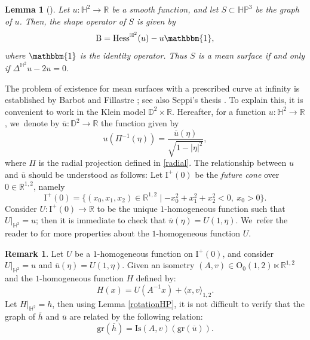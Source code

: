 \documentclass[JEP,XML,SOM,Unicode,NoEqCountersInSection, NoFloatCountersInSection,published]{cedram}
\theoremstyle{plain}
\newtheorem{lemma}[cor]{Lemma}
\theoremstyle{definition}
\newtheorem{remark}[cor]{Remark}
\newcommand{\minko}{\mathbb{R}^{1,2}}
\newcommand{\HP}{\mathbb{HP}^3}
\newcommand{\I}{\mathrm{I}}
\newcommand{\hess}{\mathrm{Hess}^{\mathbb{H}^2}}
\newcommand{\B}{\mathrm{B}}
\newcommand{\inner}[1] {\langle #1 \rangle}
\begin{document}
\begin{lemma}[{\cite[Lem.\,9.1.7]{Seppi_thesis}}]\label{Shapeoperator_of_graph}
Let $u:\mathbb{H}^2\to\mathbb{R}$ be a smooth function, and let $S\subset\HP$ be the graph of $u$. Then, the shape operator of $S$ is given by
\[
\B=\hess(u)-u\mathbbm{1},
\]
where $\mathbbm{1}$ is the identity operator. Thus $S$ is a mean surface if and only if $\Delta^{\mathbb{H}^2} u-2u=0$.
\end{lemma}
The problem of existence for mean surfaces with a prescribed curve at infinity is established by Barbot and Fillastre \cite{barbotfillastre}; see also Seppi's thesis \cite[Chap.\,9]{Seppi_thesis}. To explain this, it is convenient to work in the Klein model $\mathbb{D}^2\times\mathbb{R}$. Hereafter, for a function $u:\mathbb{H}^2\to\mathbb{R}$, we~denote by $\overline{u}:\mathbb{D}^2\to\mathbb{R}$ the function given by
\begin{equation}\label{u_et_u_bar}
u(\Pi^{-1}(\eta))=\frac{\overline{u}(\eta)}{\sqrt{1-\lvert\eta\rvert^2}},
\end{equation} where $\Pi$ is the radial projection defined in \eqref{radial}. The relationship between $u$ and $\overline{u}$ should be understood as follows: Let $\I^+(0)$ be the \emph{future cone} over $0\in\minko$, namely
\[
\I^+(0)=\{(x_0,x_1,x_2)\in\minko\mid -x_0^2+x_1^2+x_2^2<0,\ x_0>0 \}.
\]
Consider $U:\I^{+}(0)\to\mathbb{R}$ to be the unique $1$-homogeneous function such that $U|_{\mathbb{H}^2}=u$; then it is immediate to check that $\overline{u}(\eta)=U(1,\eta)$. We~refer the reader to \cite{françois_vernolli} for more properties about the $1$-homogeneous function $U$.

\begin{remark}
Let $U$ be a $1$-homogeneous function on $\I^{+}(0)$, and consider $U|_{\mathbb{H}^2}=u$ and $\overline{u}(\eta)=U(1,\eta)$. Given an isometry $(A,v)\in\mathrm{O}_0(1,2)\ltimes\minko$ and the $1$-homogeneous function $H$ defined by:
\[
H(x)=U(A^{-1}x)+\inner{x,v}_{1,2}.
\]Let $H|_{\mathbb{H}^2}=h$, then using Lemma \ref{rotationHP}, it is not difficult to verify that the graph of $\overline{h}$ and $\overline{u}$ are related by the following relation:
\begin{equation}\label{h_et_h_bar}
\mathrm{gr}(\overline{h})=\mathrm{Is}(A,v)(\mathrm{gr}(\overline{u})).
\end{equation}
\end{remark}
\end{document}
